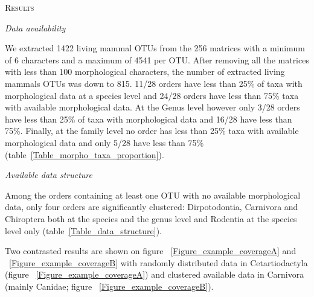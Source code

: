 \documentclass[12pt,letterpaper]{article}
\renewcommand{\section}[1]{%
\bigskip
\begin{center}
\begin{Large}
\normalfont\scshape #1
\medskip
\end{Large}
\end{center}}
\renewcommand{\subsection}[1]{%
\bigskip
\begin{center}
\begin{large}
\normalfont\itshape #1
\end{large}
\end{center}}
\begin{document}
\section{Results}

\subsection{Data availability}
We extracted 1422 living mammal OTUs from the 256 matrices with a minimum of 6 characters and a maximum of 4541 per OTU. After removing all the matrices with less than 100 morphological characters, the number of extracted living mammals OTUs was down to 815. 11/28 orders have less than 25\% of taxa with morphological data at a species level and 24/28 orders have less than 75\% taxa with available morphological data. At the Genus level however only 3/28 orders have less than 25\% of taxa with morphological data and 16/28 have less than 75\%. Finally, at the family level no order has less than 25\% taxa with available morphological data and only 5/28 have less than 75\% (table~\ref{Table_morpho_taxa_proportion}).

\renewcommand\baselinestretch{1.2}\selectfont
\begin{center}

\end{center}
\renewcommand\baselinestretch{2}\selectfont

\subsection{Available data structure}
Among the orders containing at least one OTU with no available morphological data, only four orders are significantly clustered: Dirpotodontia, Carnivora and Chiroptera both at the species and the genus level and Rodentia at the species level only (table~\ref{Table_data_structure}).

\renewcommand\baselinestretch{1.2}\selectfont
\begin{center}

\end{center}
\renewcommand\baselinestretch{2}\selectfont

Two contrasted results are shown on figure ~\ref{Figure_example_coverageA} and ~\ref{Figure_example_coverageB} with randomly distributed data in Cetartiodactyla (figure ~\ref{Figure_example_coverageA}) and clustered available data in Carnivora (mainly Canidae; figure ~\ref{Figure_example_coverageB}).
\end{document}
